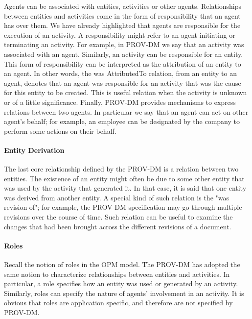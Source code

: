 Agents can be associated with entities, activities or other agents. Relationships between entities and activities come in the form of responsibility that an agent has over them. We have already highlighted that agents are responsible for the execution of an activity. A responsibility might refer to an agent initiating or terminating an activity. For example, in PROV-DM we say that an activity was associated with an agent. Similarly, an activity can be responsible for an entity. This form of responsibility can be interpreted as the attribution of an entity to an agent. In other words, the was AttributedTo relation, from an entity to an agent, denotes that an agent was responsible for an activity that was the cause for this entity to be created. This is useful relation when the activity is unknown or of a little significance. Finally, PROV-DM provides mechanisms to express relations between two agents. In particular we say that an agent can act on other agent's behalf; for example, an employee can be designated by the company to perform some actions on their behalf.

\paragraph{Entity Derivation}

The last core relationship defined by the PROV-DM is a relation between two entities. The existence of an entity might often be due to some other entity that was used by the activity that generated it. In that case, it is said that one entity was derived from another entity. A special kind of such relation is the "was revision of"; for example, the PROV-DM specification may go through multiple revisions over the course of time. Such relation can be useful to examine the changes that had been brought across the different revisions of a document.

\paragraph{Roles}

Recall the notion of roles in the OPM model. The PROV-DM has adopted the same notion to characterize relationships between entities and activities. In particular, a role specifies how an entity was used or generated by an activity. Similarly, roles can specify the nature of agents' involvement in an activity. It is obvious that roles are application specific, and therefore are not specified by PROV-DM.

